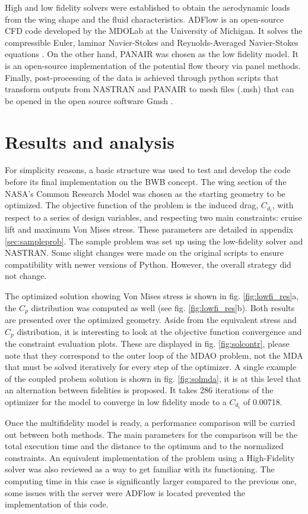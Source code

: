 High and low fidelity solvers were established to obtain the aerodynamic loads from the wing shape and the fluid characteristics. ADFlow is an open-source CFD code developed by the MDOLab at the University of Michigan. It solves the compressible Euler, laminar Navier-Stokes and Reynolds-Averaged Navier-Stokes equations \cite{lyu2013automatic}. On the other hand, PANAIR \cite{carmichael1981pan} was chosen as the low fidelity model. It is an open-source implementation of the potential flow theory via panel methods. Finally, post-processing of the data is achieved through python scripts that transform outputs from NASTRAN and PANAIR to mesh files (.msh) that can be opened in the open source software Gmsh \cite{geuzaine2009gmsh}. 

\section{Results and analysis}
\label{sec:results}
For simplicity reasons, a basic structure was used to test and develop the code before its final implementation on the BWB concept. The wing section of the NASA's Common Research Model \cite{vassberg2008development} was chosen as the starting geometry to be optimized. The objective function of the problem is the induced drag, $C_{d_i}$, with respect to a series of design variables, and respecting two main constraints: cruise lift and maximum Von Mises stress. These parameters are detailed in appendix \ref{sec:sampleprob}. The sample problem was set up using the low-fidelity solver and NASTRAN. Some slight changes were made on the original scripts to ensure compatibility with newer versions of Python. However, the overall strategy did not change. \par 
The optimized solution showing Von Mises stress is shown in fig. \ref{fig:lowfi_res}a, the $C_p$ distribution was computed as well (see fig. \ref{fig:lowfi_res}b). Both results are presented over the optimized geometry. Aside from the equivalent stress and $C_p$ distribution, it is interesting to look at the objective function convergence and the constraint evaluation plots. These are displayed in fig. \ref{fig:solcontr}, please note that they correspond to the outer loop of the MDAO problem, not the MDA that must be solved iteratively for every step of the optimizer. A single example of the coupled probem solution is shown in fig. \ref{fig:solmda}, it is at this level that an alternation between fidelities is proposed.  It takes 286 iterations of the optimizer for the model to converge in low fidelity mode to a $C_{d_i}$ of 0.00718. \par 
Once the multifidelity model is ready, a performance comparison will be carried out between both methods. The main parameters for the comparison will be the total execution time and the distance to the optimum and to the normalized constraints. An equivalent implementation of the problem using a High-Fidelity solver was also reviewed as a way to get familiar with its functioning. The computing time in this case is significantly larger compared to the previous one, some issues with the server were ADFlow is located prevented the implementation of this code.  

